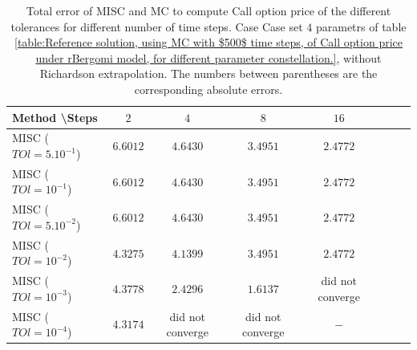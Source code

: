 \documentclass[11pt]{article}
\begin{document}
\begin{table}[h!]
	\centering
	\begin{tabular}{l*{6}{c}r}
		Method \textbackslash  Steps            & $2$ & $4$ & $8$ & $16$  \\
		\hline
		MISC ($TOl=5.10^{-1}$)  & $\mathbf{6.6012}$ & $\mathbf{ 4.6430}$ & $\mathbf{3.4951}$ & $\mathbf{ 2.4772}$  \\
		MISC ($TOl=10^{-1}$)  & $\mathbf{6.6012}$ & $\mathbf{ 4.6430}$& $\mathbf{3.4951}$ & $\mathbf{ 2.4772}$ \\
		MISC ($TOl=5.10^{-2}$)  &$\mathbf{6.6012}$& $\mathbf{ 4.6430}$& $\mathbf{3.4951}$ & $\mathbf{ 2.4772}$ \\
		MISC ($TOl=10^{-2}$)  & $\mathbf{ 4.3275}$ & $\mathbf{4.1399}$ & $\mathbf{3.4951}$ & $\mathbf{ 2.4772}$  \\
		
		MISC ($TOl=10^{-3}$)  & $\mathbf{ 4.3778}$ & $\mathbf{2.4296}$ & $\mathbf{1.6137}$ & did not converge \\
		MISC ($TOl=10^{-4}$)  & $\mathbf{ 4.3174}$ & did not converge & did not converge & $\mathbf{ -}$  \\
	
%		
%		
		\hline
	\end{tabular}
	\caption{Total error of MISC and MC to compute Call option price of the different tolerances for different number of time steps. Case Case set $4$ parametrs of table \ref{table:Reference solution, using MC with $500$ time steps, of Call option price under rBergomi model, for different parameter constellation.}, without Richardson extrapolation. The numbers between parentheses are the corresponding absolute errors.}
	\label{Total error of MISC and MC to compute Call option price of the different tolerances for different number of time steps. Case set 4, without Richardson extrapolation. The numbers between parentheses are the corresponding absolute errors.}
\end{table}
\end{document}
